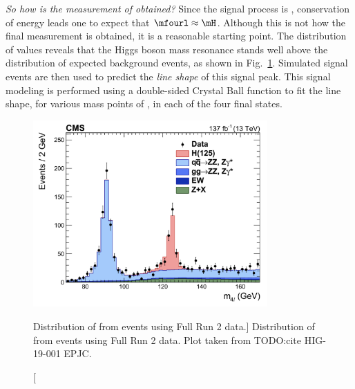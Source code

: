 \emph{So how is the measurement of \mH obtained?}
Since the signal process is \hzzfourl, conservation of energy leads one to expect that $\mfourl \approx \mH$.
Although this is not how the final measurement is obtained, it is a reasonable starting point.
The distribution of \mfourl values reveals that the Higgs boson mass resonance stands well above the distribution of expected background events, as shown in Fig.~\ref{fig:m4l_run2}.
Simulated signal events are then used to predict the \emph{line shape} of this signal peak.
This signal modeling is performed using a double-sided Crystal Ball function to fit the line shape, for various mass points of \mH, in each of the four final states.
\begin{figure}[pbth]
    \centering
    \includegraphics[width=0.8\textwidth,keepaspectratio]{figures/higgsmassmeas/m4l_FullRun2_epjc.jpeg}
		\caption
			[Distribution of \mfourl from \hzzfourl events using Full Run 2 data.]
			{Distribution of \mfourl from \hzzfourl events using Full Run 2 data. Plot taken from TODO:cite HIG-19-001 EPJC.
			}
        \label{fig:m4l_run2}
\end{figure}

